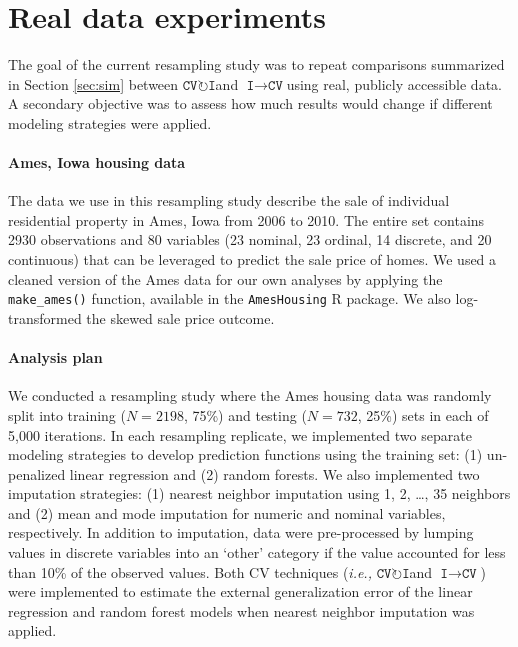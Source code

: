 \documentclass[AMA,STIX1COL,doublespace]{WileyNJD-v2}
\begin{document}
\section{Real data experiments} \label{sec:app}

The goal of the current resampling study was to repeat comparisons
summarized in Section \ref{sec:sim} between
$\texttt{CV}\!\circlearrowright\!\texttt{I}$\space and
$\texttt{I}\!\!\rightarrow\!\texttt{CV}$\space using real, publicly
accessible data. A secondary objective was to assess how much results
would change if different modeling strategies were applied.

\paragraph{Ames, Iowa housing data}

The data we use in this resampling study describe the sale of individual
residential property in Ames, Iowa from 2006 to 2010. The entire set
contains 2930 observations and 80 variables (23 nominal, 23 ordinal, 14
discrete, and 20 continuous) that can be leveraged to predict the sale
price of homes.\cite{de2011ames} We used a cleaned version of the Ames
data for our own analyses by applying the \texttt{make\_ames()}
function, available in the \texttt{AmesHousing} R
package.\cite{AmesHousing} We also log-transformed the skewed sale price
outcome.

\paragraph{Analysis plan}

We conducted a resampling study where the Ames housing data was randomly
split into training (\(N = 2198\), 75\%) and testing (\(N = 732\), 25\%)
sets in each of 5,000 iterations. In each resampling replicate, we
implemented two separate modeling strategies to develop prediction
functions using the training set: (1) un-penalized linear regression and
(2) random forests.\cite{breiman2001random} We also implemented two
imputation strategies: (1) nearest neighbor imputation using 1, 2,
\ldots, 35 neighbors and (2) mean and mode imputation for numeric and
nominal variables, respectively. In addition to imputation, data were
pre-processed by lumping values in discrete variables into an `other'
category if the value accounted for less than 10\% of the observed
values. Both CV techniques
(\textit{i.e., }$\texttt{CV}\!\circlearrowright\!\texttt{I}$\space and
$\texttt{I}\!\!\rightarrow\!\texttt{CV}$) were implemented to estimate
the external generalization error of the linear regression and random
forest models when nearest neighbor imputation was applied.
\end{document}
